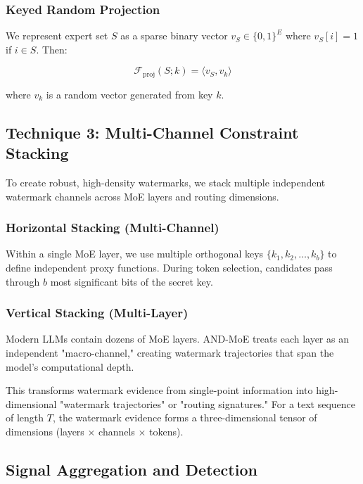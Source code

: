 \documentclass[letterpaper,twocolumn,10pt]{article}
\begin{document}
\subsubsection{Keyed Random Projection}

We represent expert set $S$ as a sparse binary vector $v_S \in \{0,1\}^E$ where $v_S[i] = 1$ if $i \in S$. Then:

\begin{equation}
\mathcal{F}_{\text{proj}}(S; k) = \langle v_S, v_k \rangle
\end{equation}

where $v_k$ is a random vector generated from key $k$.

\subsection{Technique 3: Multi-Channel Constraint Stacking}

To create robust, high-density watermarks, we stack multiple independent watermark channels across MoE layers and routing dimensions.

\subsubsection{Horizontal Stacking (Multi-Channel)}

Within a single MoE layer, we use multiple orthogonal keys $\{k_1, k_2, \ldots, k_b\}$ to define independent proxy functions. During token selection, candidates pass through $b$ most significant bits of the secret key.

\subsubsection{Vertical Stacking (Multi-Layer)}

Modern LLMs contain dozens of MoE layers. AND-MoE treats each layer as an independent "macro-channel," creating watermark trajectories that span the model's computational depth.

This transforms watermark evidence from single-point information into high-dimensional "watermark trajectories" or "routing signatures." For a text sequence of length $T$, the watermark evidence forms a three-dimensional tensor of dimensions (layers × channels × tokens).

\subsection{Signal Aggregation and Detection}
\end{document}
